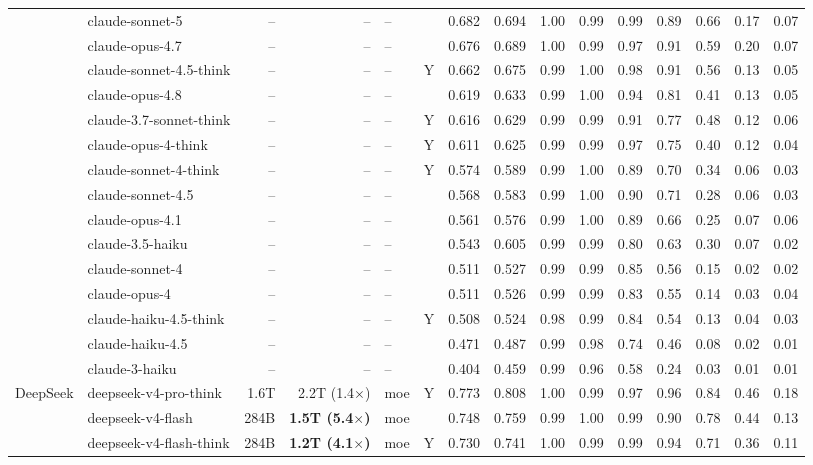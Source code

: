 \begin{longtable}{@{}ll r r l c rr rrrrrrr@{}}
 & claude-sonnet-5 & -- & -- & -- &  & 0.682 & 0.694 & 1.00 & 0.99 & 0.99 & 0.89 & 0.66 & 0.17 & 0.07 \\
 & claude-opus-4.7 & -- & -- & -- &  & 0.676 & 0.689 & 1.00 & 0.99 & 0.97 & 0.91 & 0.59 & 0.20 & 0.07 \\
 & claude-sonnet-4.5-think & -- & -- & -- & Y & 0.662 & 0.675 & 0.99 & 1.00 & 0.98 & 0.91 & 0.56 & 0.13 & 0.05 \\
 & claude-opus-4.8 & -- & -- & -- &  & 0.619 & 0.633 & 0.99 & 1.00 & 0.94 & 0.81 & 0.41 & 0.13 & 0.05 \\
 & claude-3.7-sonnet-think & -- & -- & -- & Y & 0.616 & 0.629 & 0.99 & 0.99 & 0.91 & 0.77 & 0.48 & 0.12 & 0.06 \\
 & claude-opus-4-think & -- & -- & -- & Y & 0.611 & 0.625 & 0.99 & 0.99 & 0.97 & 0.75 & 0.40 & 0.12 & 0.04 \\
 & claude-sonnet-4-think & -- & -- & -- & Y & 0.574 & 0.589 & 0.99 & 1.00 & 0.89 & 0.70 & 0.34 & 0.06 & 0.03 \\
 & claude-sonnet-4.5 & -- & -- & -- &  & 0.568 & 0.583 & 0.99 & 1.00 & 0.90 & 0.71 & 0.28 & 0.06 & 0.03 \\
 & claude-opus-4.1 & -- & -- & -- &  & 0.561 & 0.576 & 0.99 & 1.00 & 0.89 & 0.66 & 0.25 & 0.07 & 0.06 \\
 & claude-3.5-haiku & -- & -- & -- &  & 0.543 & 0.605 & 0.99 & 0.99 & 0.80 & 0.63 & 0.30 & 0.07 & 0.02 \\
 & claude-sonnet-4 & -- & -- & -- &  & 0.511 & 0.527 & 0.99 & 0.99 & 0.85 & 0.56 & 0.15 & 0.02 & 0.02 \\
 & claude-opus-4 & -- & -- & -- &  & 0.511 & 0.526 & 0.99 & 0.99 & 0.83 & 0.55 & 0.14 & 0.03 & 0.04 \\
 & claude-haiku-4.5-think & -- & -- & -- & Y & 0.508 & 0.524 & 0.98 & 0.99 & 0.84 & 0.54 & 0.13 & 0.04 & 0.03 \\
 & claude-haiku-4.5 & -- & -- & -- &  & 0.471 & 0.487 & 0.99 & 0.98 & 0.74 & 0.46 & 0.08 & 0.02 & 0.01 \\
 & claude-3-haiku & -- & -- & -- &  & 0.404 & 0.459 & 0.99 & 0.96 & 0.58 & 0.24 & 0.03 & 0.01 & 0.01 \\
DeepSeek & deepseek-v4-pro-think & 1.6T & 2.2T (1.4$\times$) & moe & Y & 0.773 & 0.808 & 1.00 & 0.99 & 0.97 & 0.96 & 0.84 & 0.46 & 0.18 \\
 & deepseek-v4-flash & 284B & \textbf{1.5T (5.4$\times$)} & moe &  & 0.748 & 0.759 & 0.99 & 1.00 & 0.99 & 0.90 & 0.78 & 0.44 & 0.13 \\
 & deepseek-v4-flash-think & 284B & \textbf{1.2T (4.1$\times$)} & moe & Y & 0.730 & 0.741 & 1.00 & 0.99 & 0.99 & 0.94 & 0.71 & 0.36 & 0.11 \\

\end{longtable}
